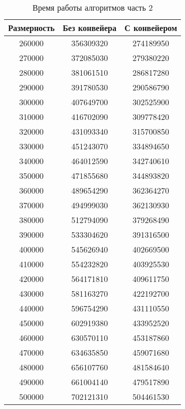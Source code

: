 \begin{table}[ph!]
  \begin{center}
    \captionsetup{justification=raggedright}
     \caption{Время работы алгоритмов часть 2}
    \label{tab:workcost_classic}
    \begin{tabular}{c|c|c}
      \textbf{Размерность} & \textbf{Без конвейера}  & \textbf{С конвейером} \\
      \hline	
		260000 & 356309320 & 274189950\\
		270000 & 372085030 & 279380220\\
		280000 & 381061510 & 286817280\\
		290000 & 391780530 & 290586790\\
		300000 & 407649700 & 302525900\\
		310000 & 416702090 & 309778420\\
		320000 & 431093340 & 315700850\\
		330000 & 451243070 & 334894650\\
		340000 & 464012590 & 342740610\\
		350000 & 471855680 & 344893820\\
		360000 & 489654290 & 362364270\\
		370000 & 494999030 & 362130930\\
		380000 & 512794090 & 379268490\\
		390000 & 533304620 & 391316500\\
		400000 & 545626940 & 402669500\\
		410000 & 554232820 & 403925530\\
		420000 & 564171810 & 409611750\\
		430000 & 581163270 & 422192700\\
		440000 & 596754290 & 431110550\\
		450000 & 602919380 & 433952520\\
		460000 & 630570110 & 453187860\\
		470000 & 634635850 & 459071680\\
		480000 & 656107760 & 481584640\\
		490000 & 661004140 & 479517890\\
		500000 & 702121310 & 504461530\\
    \end{tabular}
  \end{center}
\end{table}

